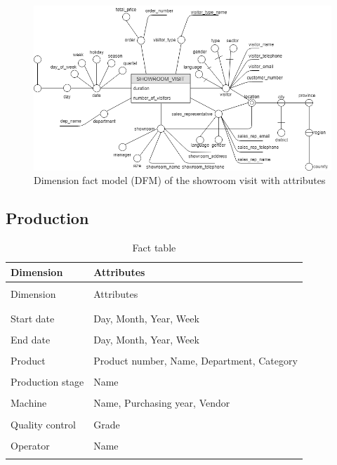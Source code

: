 \documentclass[letterpaper,12pt]{article}
\begin{document}
\begin{figure}[H] 
        \centering
        \includegraphics[width=\columnwidth]{../images/DFM_Showroom.png}
        \caption{
                \label{fig:showroomAttributes}  
                Dimension fact model (DFM) of the showroom visit with attributes 
        }
\end{figure}

\subsection{Production}

\begin{longtable}{p{4cm}p{9cm}}
        \caption{Fact table} \\
        Dimension & Attributes \\
        \endfirsthead \\
        Dimension & Attributes \\
        \endhead \\
        \hline \\
        Start date & Day, Month, Year, Week \\
        \hline \\
        End date & Day, Month, Year, Week \\
        \hline \\
        Product & Product number, Name, Department, Category \\
        \hline \\
        Production stage & Name \\
        \hline \\
        Machine & Name, Purchasing year, Vendor \\
        \hline \\
        Quality control & Grade \\
        \hline \\
        Operator & Name \\
        \hline \\
\end{longtable}
\end{document}
